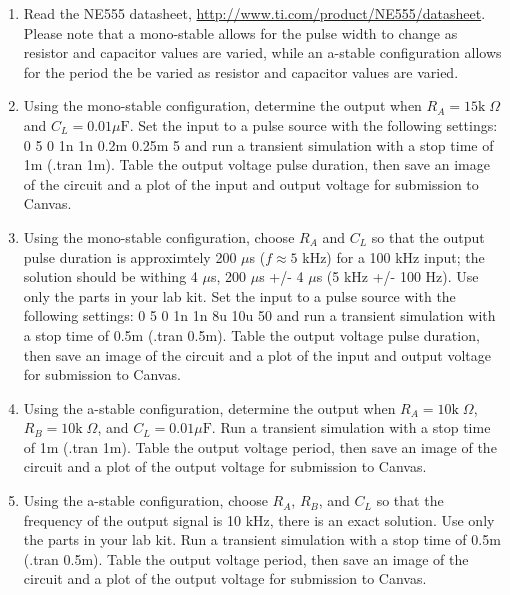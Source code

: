 \begin{enumerate}
	\item Read the NE555 datasheet, \url{http://www.ti.com/product/NE555/datasheet}. Please note that a mono-stable allows for the pulse width to change as resistor and capacitor values are varied, while an a-stable configuration allows for the period the be varied as resistor and capacitor values are varied.
	\item Using the mono-stable configuration, determine the output when $R_A = 15\mathrm{k}\;\Omega$ and $C_L = 0.01 \mu \mathrm{F}$. Set the input to a pulse source with the following settings: 0 5 0 1n 1n 0.2m 0.25m 5 and run a transient simulation with a stop time of 1m (.tran 1m). Table the output voltage pulse duration, then save an image of the circuit and a plot of the input and output voltage for submission to Canvas. \label{itm:7ssec1itm1}
	\item Using the mono-stable configuration, choose $R_A$ and $C_L$ so that the output pulse duration is  approximtely 200 $\mu$s ($f\approx 5$ kHz) for a 100 kHz input; the solution should be withing 4 $\mu$s, 200 $\mu$s +/- 4 $\mu$s (5 kHz +/- 100 Hz). Use only the parts in your lab kit. Set the input to a pulse source with the following settings: 0 5 0 1n 1n 8u 10u 50 and run a transient simulation with a stop time of 0.5m (.tran 0.5m). Table the output voltage pulse duration, then save an image of the circuit and a plot of the input and output voltage for submission to Canvas. \label{itm:7ssec1itm2}
	\item Using the a-stable configuration, determine the output when $R_A = 10\mathrm{k}\;\Omega$, $R_B = 10\mathrm{k}\;\Omega$, and $C_L = 0.01 \mu \mathrm{F}$. Run a transient simulation with a stop time of 1m (.tran 1m). Table the output voltage period, then save an image of the circuit and a plot of the output voltage for submission to Canvas. \label{itm:7ssec1itm3}
	\item Using the a-stable configuration, choose $R_A$, $R_B$, and $C_L$ so that the frequency of the output signal is 10 kHz, there is an exact solution. Use only the parts in your lab kit. Run a transient simulation with a stop time of 0.5m (.tran 0.5m). Table the output voltage period, then save an image of the circuit and a plot of the output voltage for submission to Canvas. \label{itm:7ssec1itm4}
\end{enumerate}

